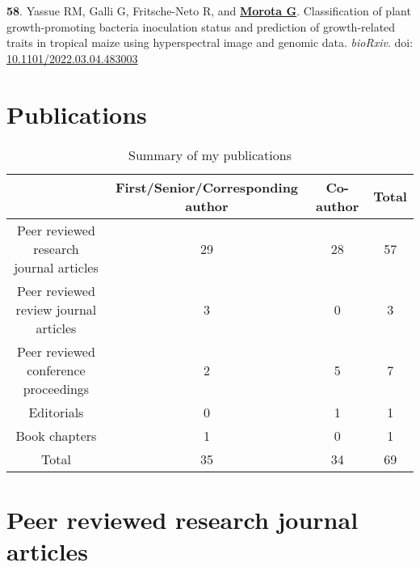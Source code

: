 \documentclass[margin,line,10pt]{res}
\newenvironment{list1}{
  \begin{list}{\ding{113}}{%
      \setlength{\itemsep}{0in}
      \setlength{\parsep}{0in} \setlength{\parskip}{0in}
      \setlength{\topsep}{0in} \setlength{\partopsep}{0in} 
      \setlength{\leftmargin}{0.17in}}}{\end{list}}
\begin{document}
\begin{resume}
\begin{list1}
       \item [{\bf 58}.] Yassue RM, Galli G, Fritsche-Neto R, and \textbf{\underline{Morota G}}. Classification of plant growth-promoting bacteria inoculation status and prediction of growth-related traits in tropical maize using hyperspectral image and genomic data. \emph{bioRxiv}. doi: \textcolor{blue}{\href{https://doi.org/10.1101/2022.03.04.483003}{10.1101/2022.03.04.483003}}  
                      
      
\end{list1}

  
\vspace{0.5cm}


\section{\sc Publications}
\vspace{1cm}

\begin{table}[h!]
\centering
  \begin{tabular}{ |c|c|c|c| }
 \hline
 & First/Senior/Corresponding author & Co-author & Total \\  \hline
Peer reviewed research journal articles  & 29 & 28 & 57 \\  \hline
Peer reviewed review journal articles  & 3 & 0 & 3 \\  \hline
Peer reviewed conference proceedings & 2 & 5 & 7 \\ \hline
Editorials & 0 & 1 & 1 \\ \hline
Book chapters & 1 & 0 & 1 \\ \hline
Total & 35 &  34 & 69 \\ \hline
  \end{tabular}
    \caption{Summary of my publications}
\end{table}

\vspace{0.5cm}

\section{\sc Peer reviewed research journal articles}

\vspace{1.5cm}


\end{resume}
\end{document}
